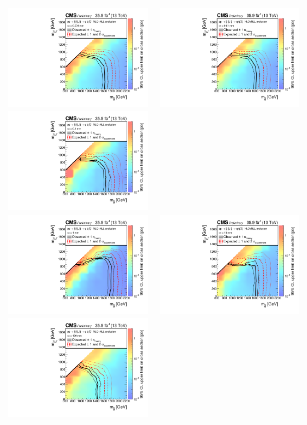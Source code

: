 \clearpage
\begin{figure}[!t]
  \centering
  \includegraphics[width=0.33\textwidth]{Figures/T1qqqqLL_ctau-0p001_XSEC}~
  \includegraphics[width=0.33\textwidth]{Figures/T1qqqqLL_ctau-0p01_XSEC}~
  \includegraphics[width=0.33\textwidth]{Figures/T1qqqqLL_ctau-0p1_XSEC}\\
  \includegraphics[width=0.33\textwidth]{Figures/T1qqqqLL_ctau-1_XSEC}~
  \includegraphics[width=0.33\textwidth]{Figures/T1qqqqLL_ctau-10_XSEC}~
  \includegraphics[width=0.33\textwidth]{Figures/T1qqqqLL_ctau-100_XSEC}\\

\end{figure}
